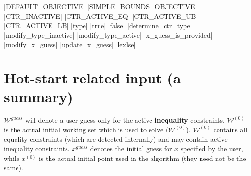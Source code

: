 \documentclass[12pt,a4paper]{article}
\begin{document}
|DEFAULT_OBJECTIVE|
|SIMPLE_BOUNDS_OBJECTIVE|
|CTR_INACTIVE|
|CTR_ACTIVE_EQ|
|CTR_ACTIVE_UB|
|CTR_ACTIVE_LB|
|type|
|true|
|false|
|determine_ctr_type|
|modify_type_inactive|
|modify_type_active|
|x_guess_is_provided|
|modify_x_guess|
|update_x_guess|
|lexlse|

\section{Hot-start related input (a summary)}

$\mathcal{W}^{\mathit{guess}}$ will denote a user guess only for the active {\bf inequality}
constraints. $\mathcal{W}^{(0)}$ is the actual initial working set which is used to solve
($\mathcal{W}^{(0)}$). $\mathcal{W}^{(0)}$ contains all equality constraints (which are
detected internally) and may contain active inequality constraints. $x^{\mathit{guess}}$ denotes the
initial guess for $x$ specified by the user, while $x^{(0)}$ is the actual initial point used in the
algorithm (they need not be the same).
\end{document}
